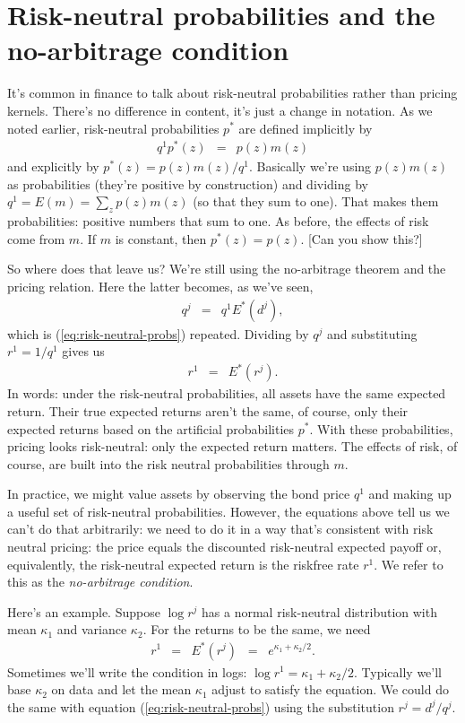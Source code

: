 \documentclass[11pt]{article}
\begin{document}
\section{Risk-neutral probabilities and the no-arbitrage condition}


It's common in finance to talk about risk-neutral probabilities rather than pricing kernels.
There's no difference in content, it's just a change in notation.
As we noted earlier, risk-neutral probabilities $p^*$ are defined implicitly by
\begin{eqnarray}
    q^1 p^*(z) &=& p(z) m(z)
    \label{eq:def-pstar}
\end{eqnarray}
and explicitly by $  p^*(z) = p(z) m(z)/q^1 $.
Basically we're using $p(z) m(z)$ as probabilities (they're positive by construction)
and dividing by $ q^1 = E(m) = \sum_z p(z) m(z)$ (so that they sum to one).
That makes them probabilities:  positive numbers that sum to one.
As before, the effects of risk come from $m$.
If $m$ is constant, then $p^*(z) = p(z)$.
[Can you show this?]

So where does that leave us?
We're still using the no-arbitrage theorem and the pricing relation.
Here the latter becomes, as we've seen,
\begin{eqnarray*}
    q^j &=& q^1 E^* (d^j),
\end{eqnarray*}
which is (\ref{eq:risk-neutral-probs}) repeated.
Dividing by $q^j$ and substituting $r^1 = 1/q^1$ gives us
\begin{eqnarray*}
    r^1 &=& E^* (r^j).
\end{eqnarray*}
In words:  under the risk-neutral probabilities, all assets have the same expected return.
Their true expected returns aren't the same, of course,
only their expected returns based on the artificial probabilities $p^*$.
With these probabilities, pricing looks risk-neutral:  only the expected return
matters.
The effects of risk, of course, are built into the risk neutral probabilities through $m$.


In practice, we might value assets by observing the bond price $q^1$
and making up a useful set of risk-neutral probabilities.
However, the equations above tell us we can't do that arbitrarily:
we need to do it in a way that's consistent with risk neutral pricing:
the price equals the discounted risk-neutral expected payoff or, equivalently,
the risk-neutral expected return is the riskfree rate $r^1$.
We refer to this as the {\it no-arbitrage condition\/}.

Here's an example.
Suppose $ \log r^j $ has a normal risk-neutral distribution with mean
$\kappa_1$ and variance $\kappa_2$.
For the returns to be the same, we need
\begin{eqnarray*}
    r^1 &=& E^*(r^j) \;\;=\;\; e^{\kappa_1 + \kappa_2/2} .
\end{eqnarray*}
Sometimes we'll write the condition in logs:
$ \log r^1 = \kappa_1 + \kappa_2/2$.
Typically we'll base $\kappa_2$ on data and let the mean $\kappa_1$ adjust to satisfy the equation.
We could do the same with equation (\ref{eq:risk-neutral-probs})
using the substitution $ r^j = d^j/q^j$.
\end{document}

